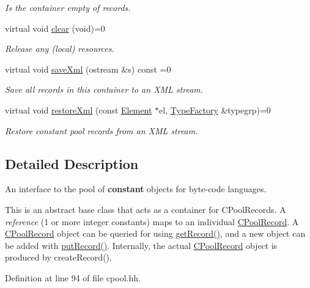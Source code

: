 \begin{DoxyCompactItemize}
\begin{DoxyCompactList}\small\item\em Is the container empty of records. \end{DoxyCompactList}\item 
virtual void \mbox{\hyperlink{class_constant_pool_a3cb5e39704c4dacbe8782742c2f218c4}{clear}} (void)=0
\begin{DoxyCompactList}\small\item\em Release any (local) resources. \end{DoxyCompactList}\item 
virtual void \mbox{\hyperlink{class_constant_pool_a859daeda0a7969af5462f6484905ab08}{save\+Xml}} (ostream \&s) const =0
\begin{DoxyCompactList}\small\item\em Save all records in this container to an X\+ML stream. \end{DoxyCompactList}\item 
virtual void \mbox{\hyperlink{class_constant_pool_a1ba24a59e40a1110cdd5d2a63f1a978c}{restore\+Xml}} (const \mbox{\hyperlink{class_element}{Element}} $\ast$el, \mbox{\hyperlink{class_type_factory}{Type\+Factory}} \&typegrp)=0
\begin{DoxyCompactList}\small\item\em Restore constant pool records from an X\+ML stream. \end{DoxyCompactList}\end{DoxyCompactItemize}


\subsection{Detailed Description}
An interface to the pool of {\bfseries{constant}} objects for byte-\/code languages. 

This is an abstract base class that acts as a container for C\+Pool\+Records. A {\itshape reference} (1 or more integer constants) maps to an individual \mbox{\hyperlink{class_c_pool_record}{C\+Pool\+Record}}. A \mbox{\hyperlink{class_c_pool_record}{C\+Pool\+Record}} object can be queried for using \mbox{\hyperlink{class_constant_pool_ac17df35ff1376311f62912d29bf26cad}{get\+Record()}}, and a new object can be added with \mbox{\hyperlink{class_constant_pool_a004b94bca379a22b84d11b7299eabdd8}{put\+Record()}}. Internally, the actual \mbox{\hyperlink{class_c_pool_record}{C\+Pool\+Record}} object is produced by create\+Record(). 

Definition at line 94 of file cpool.\+hh.



